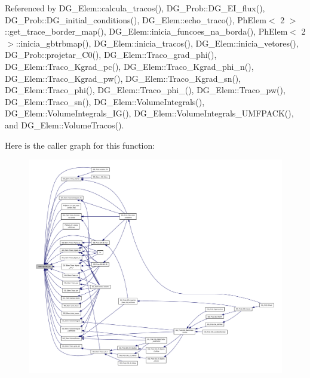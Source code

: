 Referenced by D\+G\+\_\+\+Elem\+::calcula\+\_\+tracos(), D\+G\+\_\+\+Prob\+::\+D\+G\+\_\+\+E\+I\+\_\+flux(), D\+G\+\_\+\+Prob\+::\+D\+G\+\_\+initial\+\_\+conditions(), D\+G\+\_\+\+Elem\+::echo\+\_\+traco(), Ph\+Elem$<$ 2 $>$\+::get\+\_\+trace\+\_\+border\+\_\+map(), D\+G\+\_\+\+Elem\+::inicia\+\_\+funcoes\+\_\+na\+\_\+borda(), Ph\+Elem$<$ 2 $>$\+::inicia\+\_\+gbtrbmap(), D\+G\+\_\+\+Elem\+::inicia\+\_\+tracos(), D\+G\+\_\+\+Elem\+::inicia\+\_\+vetores(), D\+G\+\_\+\+Prob\+::projetar\+\_\+\+C0(), D\+G\+\_\+\+Elem\+::\+Traco\+\_\+grad\+\_\+phi(), D\+G\+\_\+\+Elem\+::\+Traco\+\_\+\+Kgrad\+\_\+pc(), D\+G\+\_\+\+Elem\+::\+Traco\+\_\+\+Kgrad\+\_\+phi\+\_\+n(), D\+G\+\_\+\+Elem\+::\+Traco\+\_\+\+Kgrad\+\_\+pw(), D\+G\+\_\+\+Elem\+::\+Traco\+\_\+\+Kgrad\+\_\+sn(), D\+G\+\_\+\+Elem\+::\+Traco\+\_\+phi(), D\+G\+\_\+\+Elem\+::\+Traco\+\_\+phi\+\_(), D\+G\+\_\+\+Elem\+::\+Traco\+\_\+pw(), D\+G\+\_\+\+Elem\+::\+Traco\+\_\+sn(), D\+G\+\_\+\+Elem\+::\+Volume\+Integrals(), D\+G\+\_\+\+Elem\+::\+Volume\+Integrals\+\_\+\+I\+G(), D\+G\+\_\+\+Elem\+::\+Volume\+Integrals\+\_\+\+U\+M\+F\+P\+A\+C\+K(), and D\+G\+\_\+\+Elem\+::\+Volume\+Tracos().

Here is the caller graph for this function\+:
\nopagebreak
\begin{figure}[H]
\begin{center}
\leavevmode
\includegraphics[width=350pt]{classStdel_a457d20e34fb7a32eb1e4aca6c19f53a2_icgraph}
\end{center}
\end{figure}
\mbox{\label{classTetrahedral_a05fc469d2a88e8a08a0a64621883d021}} 
